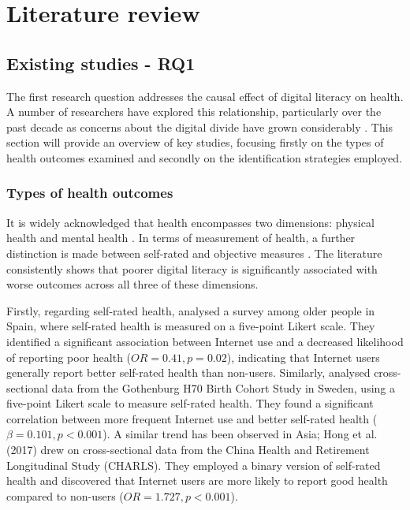 \chapter{\label{ch:2-litreview}Literature review}

\section{Existing studies - RQ1}
The first research question addresses the causal effect of digital literacy on health. A number of researchers have explored this relationship, particularly over the past decade as concerns about the digital divide have grown considerably \parencite{ariaslopez_digital_2023}. This section will provide an overview of key studies, focusing firstly on the types of health outcomes examined and secondly on the identification strategies employed.

\subsection{Types of health outcomes}
It is widely acknowledged that health encompasses two dimensions: physical health and mental health \parencite{departmentofhealth_relationship_2014,worldbank_secure_2024}. In terms of measurement of health, a further distinction is made between self-rated and objective measures \parencite{baker_what_2004,wu_relationship_2013}. The literature consistently shows that poorer digital literacy is significantly associated with worse outcomes across all three of these dimensions.

Firstly, regarding self-rated health, \textcite{gracia_internet_2009} analysed a survey among older people in Spain, where self-rated health is measured on a five-point Likert scale. They identified a significant association between Internet use and a decreased likelihood of reporting poor health ($OR = 0.41, p = 0.02$), indicating that Internet users generally report better self-rated health than non-users. Similarly, \textcite{falkerhag_internet_2019} analysed cross-sectional data from the Gothenburg H70 Birth Cohort Study in Sweden, using a five-point Likert scale to measure self-rated health. They found a significant correlation between more frequent Internet use and better self-rated health ($\beta = 0.101, p < 0.001$). A similar trend has been observed in Asia; Hong et al. (2017) drew on cross-sectional data from the China Health and Retirement Longitudinal Study (CHARLS). They employed a binary version of self-rated health and discovered that Internet users are more likely to report good health compared to non-users ($OR = 1.727, p < 0.001$).

